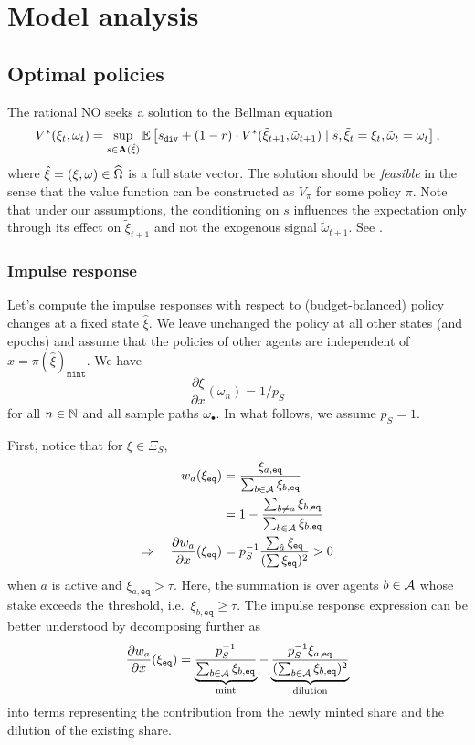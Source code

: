 \newpage
\section{Model analysis}



\subsection{Optimal policies}

The rational NO seeks a solution to the Bellman equation
\[
  V^*(\xi_t,\omega_t) = \sup_{s\in\mathbf{A}(\hat\xi)} 
    \mathbb{E}\left[ 
      s_\mathtt{div} + (1-r)\cdot V^*(\tilde\xi_{t+1},\tilde\omega_{t+1}) 
      \mid s ,\tilde\xi_t=\xi_t,\tilde\omega_t=\omega_t
    \right],
\]
where $\hat\xi = (\xi,\omega)\in\widehat{\Omega}$ is a full state vector. 
%
The solution should be \emph{feasible} in the sense that the value function can be constructed as $V_\pi$ for some policy $\pi$.
%
Note that under our assumptions, the conditioning on $s$ influences the expectation only through its effect on $\tilde\xi_{t+1}$ and not the exogenous signal $\tilde\omega_{t+1}$.
%
See \cite[Chap.~4]{sutton2018reinforcement}.

\subsubsection{Impulse response}
Let's compute the impulse responses with respect to (budget-balanced) policy changes at a fixed state $\hat{\xi}$.
%
We leave unchanged the policy at all other states (and epochs) and assume that the policies of other agents are independent of $x=\pi(\hat{\xi})_\mathtt{mint}$.
%
We have
\[
  \frac{\partial\xi}{\partial x}(\omega_n) = 1/p_S
\]
for all $n\in\mathbb{N}$ and all sample paths $\omega_\bullet$.
%
In what follows, we assume $p_S=1$.

First, notice that for $\xi\in\Xi_S$,
\begin{align*}
  w_a(\xi_\mathtt{eq}) &= \frac{ \xi_{a,\mathtt{eq}} }{ \sum_{b\in\mathcal{A}}\xi_{b,\mathtt{eq}} } \\
  &= 1 - \frac{ \sum_{b\neq a}\xi_{b,\mathtt{eq}} }{ \sum_{b\in\mathcal{A}}\xi_{b,\mathtt{eq}} }  \\
  \Rightarrow\quad  \frac{\partial w_a}{\partial x}(\xi_\mathtt{eq}) &= p_S^{-1}\frac{\sum_{\hat{a}} \xi_\mathtt{eq}}{(\sum \xi_\mathtt{eq})^2} > 0 \\
\end{align*}
when $a$ is active and $\xi_{a,\mathtt{eq}}>\tau$.
%
Here, the summation is over agents $b\in\mathcal{A}$ whose stake exceeds the threshold, i.e.~$\xi_{b,\mathtt{eq}}\geq\tau$.
%
The impulse response expression can be better understood by decomposing further as
\[
  \frac{\partial w_a}{\partial x}(\xi_\mathtt{eq}) = 
    \underbrace{ \frac{ p_S^{-1} }{ \sum_{b\in\mathcal{A}}\xi_{b,\mathtt{eq}} } }_{\text{mint}} - 
    \underbrace{ \frac{ p_S^{-1}\xi_{a,\mathtt{eq}} }{ (\sum_{b\in\mathcal{A}}\xi_{b,\mathtt{eq}})^2 } }_{\text{dilution}}
\]
into terms representing the contribution from the newly minted share and the dilution of the existing share.

